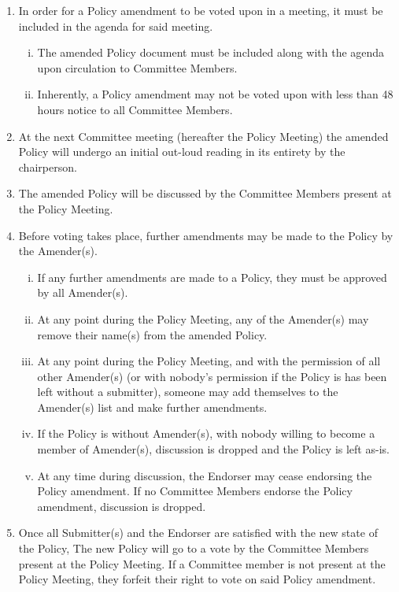 \documentclass[a4paper,12pt]{article}
\begin{document}
\begin{enumerate}[1)]
	\item In order for a Policy amendment to be voted upon in a meeting, it must be included in the agenda for said meeting.
	\begin{enumerate}[i)]
		\item The amended Policy document must be included along with the agenda upon circulation to Committee Members.
		\item Inherently, a Policy amendment may not be voted upon with less than 48 hours notice to all Committee Members.
	\end{enumerate}
	\item At the next Committee meeting (hereafter the Policy Meeting) the amended Policy will undergo an initial out-loud reading in its entirety by the chairperson.
	\item The amended Policy will be discussed by the Committee Members present at the Policy Meeting.
	\item Before voting takes place, further amendments may be made to the Policy by the Amender(s).
	\begin{enumerate}[i)]
		\item If any further amendments are made to a Policy, they must be approved by all Amender(s).
		\item At any point during the Policy Meeting, any of the Amender(s) may remove their name(s) from the amended Policy.
		\item At any point during the Policy Meeting, and with the permission of all other Amender(s) (or with nobody's permission if the Policy is has been left without a submitter), someone may add themselves to the Amender(s) list and make further amendments.
		\item If the Policy is without Amender(s), with nobody willing to become a member of Amender(s), discussion is dropped and the Policy is left as-is.
		\item At any time during discussion, the Endorser may cease endorsing the Policy amendment. If no Committee Members endorse the Policy amendment, discussion is dropped.
	\end{enumerate}
	\item Once all Submitter(s) and the Endorser are satisfied with the new state of the Policy, The new Policy will go to a vote by the Committee Members present at the Policy Meeting. If a Committee member is not present at the Policy Meeting, they forfeit their right to vote on said Policy amendment.
	\begin{enumerate}[i)]

\end{enumerate}
\end{enumerate}
\end{document}
